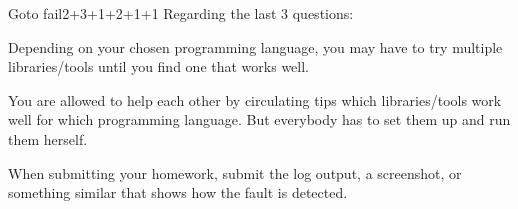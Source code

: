 \documentclass[a4paper]{article}
\begin{document}
\begin{problem}{Goto fail}{2+3+1+2+1+1}
Regarding the last 3 questions:
\begin{compactitem}
 \item Depending on your chosen programming language, you may have to try multiple libraries/tools until you find one that works well.
 \item You are allowed to help each other by circulating tips which libraries/tools work well for which programming language.
 But everybody has to set them up and run them herself.
 \item When submitting your homework, submit the log output, a screenshot, or something similar that shows how the fault is detected.
\end{compactitem}
\end{problem}
\end{document}
